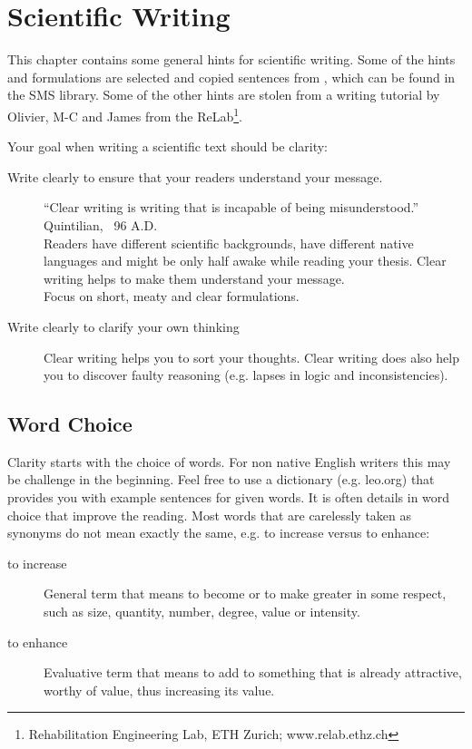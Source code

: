 
\chapter{Scientific Writing}\label{scientificWriting}

This chapter contains some general hints for scientific writing.
Some of the hints and formulations are selected and copied sentences from \cite{zeiger2000ewb}, which can be found in the SMS library. Some of the other hints are stolen from a writing tutorial by Olivier, M-C and James from the ReLab\footnote{Rehabilitation Engineering Lab, ETH Zurich; www.relab.ethz.ch}.

\vspace{0.5cm}

Your goal when writing a scientific text should be clarity:
\begin{description}
	\item[Write clearly to ensure that your readers understand your message.] 
		``Clear writing is writing that is incapable of being misunderstood.'' Quintilian, \Cross ~96 A.D.  \hfill \\
		Readers have different scientific backgrounds, have different native languages and might be only half awake while reading your thesis. Clear writing helps to make them understand your message. \hfill \\
		Focus on short, meaty and clear formulations.
	\item[Write clearly to clarify your own thinking] Clear writing helps you to sort your thoughts. Clear writing does also help you to discover faulty reasoning (e.g. lapses in logic and inconsistencies).
\end{description}

\section{Word Choice}

Clarity starts with the choice of words.
For non native English writers this may be challenge in the beginning.
Feel free to use a dictionary (e.g. leo.org) that provides you with example sentences for given words.
It is often details in word choice that improve the reading. Most words that are carelessly taken as synonyms do not mean exactly the same, e.g. to increase versus to enhance:
\begin{description}
	\item[to increase] General term that means to become or to make greater in some respect, such as size, quantity, number, degree, value or intensity.
	\item[to enhance] Evaluative term that means to add to something that is already attractive, worthy of value, thus increasing its value.
\end{description}


